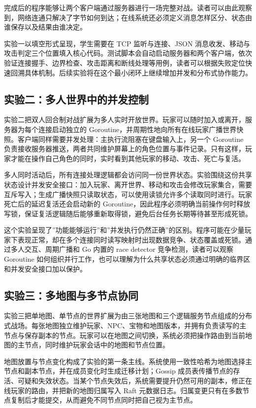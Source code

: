 完成后的程序能够让两个客户端通过服务器进行一场完整对战。读者可以由此观察到，网络连通只解决了字节如何到达；在线系统还必须定义消息怎样区分、状态由谁保存以及结果由谁决定。

实验一以填空形式呈现，学生需要在 TCP 监听与连接、JSON 消息收发、移动与攻击判定三个位置填入核心代码。测试脚本会自动启动服务器和两个客户端，依次验证连接握手、边界检查、攻击距离和断线处理等用例，读者可以根据失败定位快速回溯具体机制。后续实验将在这个最小闭环上继续增加并发和分布式协作能力。

\subsection{实验二：多人世界中的并发控制}
\label{sec:appendix-lab2}

实验二把双人回合制对战扩展为多人实时开放世界。玩家可以随时加入或离开，服务器为每个连接启动独立的 Goroutine，并周期性地向所有在线玩家广播世界快照。客户端同样需要并发处理：主执行流阻塞在键盘输入上，另一个 Goroutine 负责接收服务器推送，两者共同维护屏幕上的角色位置与事件记录。只有这样，玩家才能在操作自己角色的同时，实时看到其他玩家的移动、攻击、死亡与复活。

多人同时活动后，所有连接处理逻辑都会访问同一份世界状态。实验围绕这份共享状态设计并发安全接口：加入玩家、离开世界、移动和攻击会修改玩家集合，需要互斥写入；生成广播快照只读取状态，可以使用读锁允许多个读取同时进行。玩家死亡后的延迟复活还会启动新的 Goroutine，因此程序必须明确当前操作何时释放写锁，保证复活逻辑随后能够重新取得锁，避免后台任务长期等待甚至形成死锁。

这个实验呈现了”功能能够运行”和”并发执行仍然正确”的区别。程序可能在少量玩家下表现正常，却在多个连接同时读写映射时出现数据竞争、状态覆盖或死锁。通过多人交互、周期广播和 Go 内置的 race detector 竞争检测，读者可以观察 Goroutine 如何组织并行工作，也可以理解为什么共享状态必须通过明确的临界区和并发安全接口加以保护。

\subsection{实验三：多地图与多节点协同}
\label{sec:appendix-lab3}

实验三把单地图、单节点的世界扩展为由三张地图和三个逻辑服务节点组成的分布式战场。每张地图独立维护玩家、NPC、宝物和地图版本，并拥有负责读写的主节点与保存副本的节点。玩家可以在地图之间切换，系统必须把操作路由到当前地图的主节点，同时维护玩家会话中的地图和节点位置。

地图放置与节点变化构成了实验的第一条主线。系统使用一致性哈希为地图选择主节点和副本节点，并在成员变化时生成迁移计划；Gossip 成员表传播节点的存活、可疑和失效状态。当某个节点失效后，系统需要提升仍然可用的副本，修正在线玩家的路由，并把新的地图归属写入 Raft 元数据日志。归属变更只有在多数节点复制后才能提交，从而避免不同节点同时把自己视为主节点。

